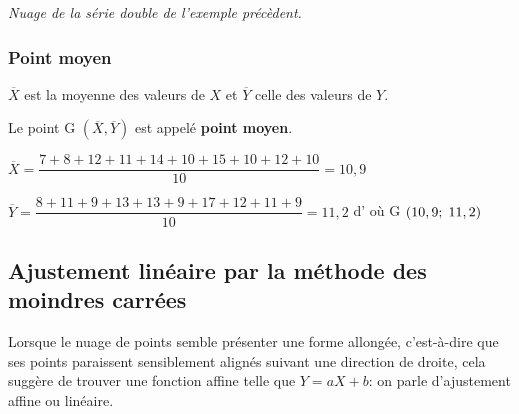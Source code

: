 \begin{example}
\textit{Nuage de la série double de l'exemple précèdent.}

\begin{center}

\end{center}
\end{example}



\subsubsection*{Point moyen}

\begin{definition}
\noindent $ \overline{X} $ est la moyenne des valeurs de  $X$ et  $ \overline{Y} $
celle des valeurs de  $Y$.
\medskip

Le point G $ (  \overline{X} , \overline{Y}  )$ est appelé \textbf{point moyen}.

\end{definition}

\begin{example}

$ \overline{X}=\dfrac{ 7+ 8 +12+  11 +  14  +10 + 15 + 10  +12 + 10 }{10}=10,9 $

\bigskip
$ \overline{Y}=\dfrac{  8 + 11 + 9 + 13+13 +9 +17 +12 +11+9}{10}= 11,2$  \hspace*{1cm} d' où  \; G $\left( 10,9 ;\; 11,2  \right)$
\end{example}




\subsection{Ajustement linéaire par la méthode des moindres carrées}
   Lorsque le nuage de points semble présenter une forme allongée, c'est-à-dire que ses points paraissent sensiblement alignés suivant une direction de droite, cela suggère de trouver une fonction  affine telle que  $Y = aX+b $:  on parle  d'ajustement affine ou linéaire.

